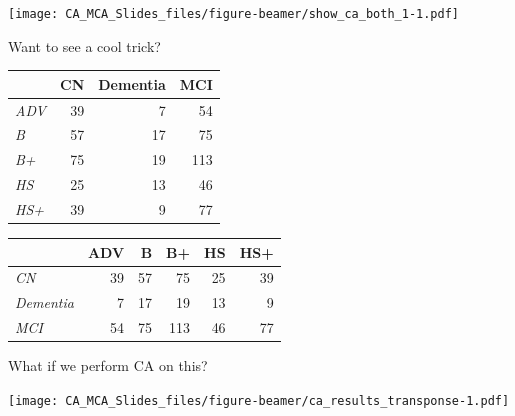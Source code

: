 \documentclass[
  ignorenonframetext,
]{beamer}
\begin{document}
\begin{frame}

\texttt{[image: CA\_MCA\_Slides\_files/figure-beamer/show\_ca\_both\_1-1.pdf]}

\end{frame}

\begin{frame}

Want to see a cool trick?

\end{frame}

\begin{frame}

\begin{table}[H]
\centering
\begin{tabular}{>{\em}lrrr}
\toprule
  & CN & Dementia & MCI\\
\midrule
ADV & 39 & 7 & 54\\
B & 57 & 17 & 75\\
B+ & 75 & 19 & 113\\
HS & 25 & 13 & 46\\
HS+ & 39 & 9 & 77\\
\bottomrule
\end{tabular}
\end{table}

\end{frame}

\begin{frame}

\begin{table}[H]
\centering
\begin{tabular}{>{\em}lrrrrr}
\toprule
  & ADV & B & B+ & HS & HS+\\
\midrule
CN & 39 & 57 & 75 & 25 & 39\\
Dementia & 7 & 17 & 19 & 13 & 9\\
MCI & 54 & 75 & 113 & 46 & 77\\
\bottomrule
\end{tabular}
\end{table}

What if we perform CA on this?

\end{frame}

\begin{frame}

\texttt{[image: CA\_MCA\_Slides\_files/figure-beamer/ca\_results\_transponse-1.pdf]}

\end{frame}
\end{document}
